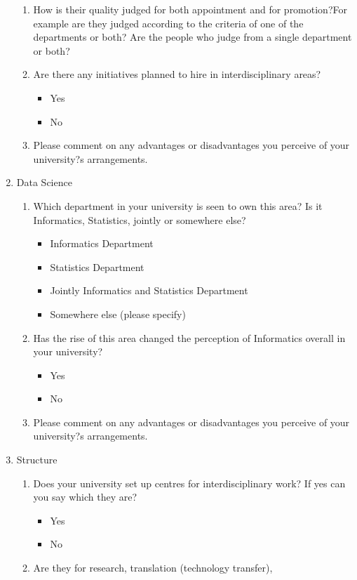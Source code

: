 \begin{enumerate}
\begin{enumerate}
\item How is their quality judged for both appointment and for promotion?For example are they judged according to the criteria of one
of the departments or both? Are the people who judge from a single
department or both?
\item Are there any initiatives planned to hire in interdisciplinary areas?
\begin{itemize}
\item Yes
\item No
\end{itemize}
\item Please comment on any advantages or disadvantages you perceive of your university?s arrangements.
\end{enumerate}
\item Data Science
\begin{enumerate}
\item Which department in your university is seen to own this area? Is it
Informatics, Statistics, jointly or somewhere else?
\begin{itemize}
\item Informatics Department
\item Statistics Department
\item Jointly Informatics and Statistics Department
\item Somewhere else (please specify)
\end{itemize}
\item Has the rise of this area changed the perception of Informatics
overall in your university?
\begin{itemize}
\item Yes
\item No
\end{itemize}
\item Please comment on any advantages or disadvantages you perceive of
your university?s arrangements.
\end{enumerate}
\item Structure
\begin{enumerate}
\item Does your university set up centres for interdisciplinary work? If
yes can you say which they are?
\begin{itemize}
\item Yes
\item No
\end{itemize}
\item Are they for research, translation (technology transfer),

\end{enumerate}
\end{enumerate}
